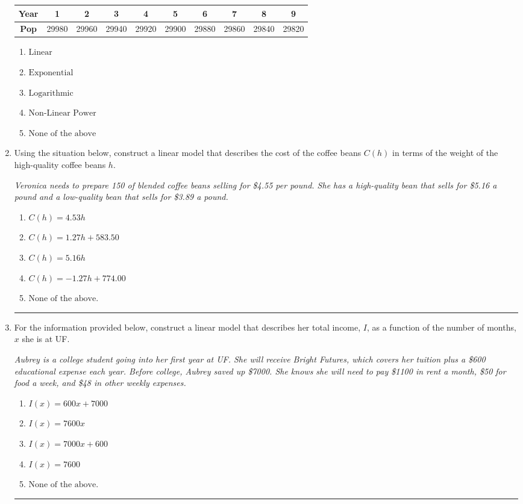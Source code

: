 \documentclass[14pt]{extbook}
\newcommand{\litem}[1]{\item#1\hspace*{-1cm}\rule{\textwidth}{0.4pt}}
\begin{document}
\begin{enumerate}
{\begin{tabular}{c|c|c|c|c|c|c|c|c|c}
\textbf{Year} &1 &2 &3 &4 &5 &6 &7 &8 &9\tabularnewline \hline
\textbf{Pop} &29980 &29960 &29940 &29920 &29900 &29880 &29860 &29840 &29820\end{tabular}\begin{enumerate}[label=\Alph*.]
\item \( \text{Linear} \)
\item \( \text{Exponential} \)
\item \( \text{Logarithmic} \)
\item \( \text{Non-Linear Power} \)
\item \( \text{None of the above} \)

\end{enumerate} }
\litem{
Using the situation below, construct a linear model that describes the cost of the coffee beans $C(h)$ in terms of the weight of the high-quality coffee beans $h$.
\begin{center}
    \textit{ Veronica needs to prepare 150 of blended coffee beans selling for \$4.55 per pound. She has a high-quality bean that sells for \$5.16 a pound and a low-quality bean that sells for \$3.89 a pound. }
\end{center}
\begin{enumerate}[label=\Alph*.]
\item \( C(h) = 4.53 h \)
\item \( C(h) = 1.27 h + 583.50 \)
\item \( C(h) = 5.16 h \)
\item \( C(h) = -1.27 h + 774.00 \)
\item \( \text{None of the above.} \)

\end{enumerate} }
\litem{
For the information provided below, construct a linear model that describes her total income, $I$, as a function of the number of months, $x$ she is at UF.
\begin{center}
    \textit{ Aubrey is a college student going into her first year at UF. She will receive Bright Futures, which covers her tuition plus a \$600 educational expense each year. Before college, Aubrey saved up \$7000. She knows she will need to pay \$1100 in rent a month, \$50 for food a week, and \$48 in other weekly expenses. }
\end{center}
\begin{enumerate}[label=\Alph*.]
\item \( I(x) = 600 x + 7000 \)
\item \( I(x) = 7600 x \)
\item \( I(x) = 7000 x + 600 \)
\item \( I(x) = 7600 \)
\item \( \text{None of the above.} \)


\end{enumerate}}
\end{enumerate}
\end{document}
